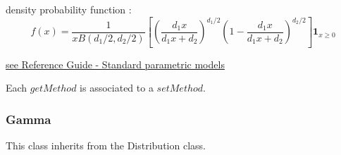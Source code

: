 \begin{description}
\begin{description}
  \end{description}

\item[Details :]  \rule{0pt}{1em}
  \begin{description}
  \item density probability function :
    $$
    f(x) = \displaystyle \frac{1}{xB(d_1/2, d_2/2)}\left[\left(\frac{d_1x}{d_1x+d_2}\right)^{d_1/2} \left(1-\frac{d_1x}{d_1x+d_2}\right)^{d_2/2} \right]\mathbf{1}_{x \geq 0}
    $$
  \end{description}

\item[Links :]  \rule{0pt}{1em}
  \href{OpenTURNS_ReferenceGuide.pdf}{see Reference Guide - Standard parametric models}
\end{description}

Each  $getMethod$  is associated to a $setMethod$.

\newpage \subsubsection{Gamma}

This class inherits from the Distribution class.

